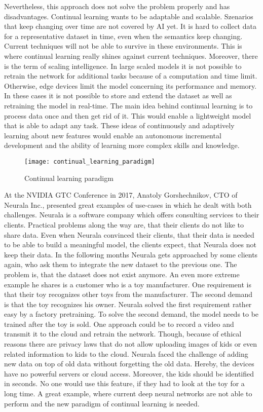 Nevertheless, this approach does not solve the problem properly and has disadvantages.
Continual learning wants to be adaptable and scalable.
Szenarios that keep changing over time are not covered by AI yet.
It is hard to collect data for a representative dataset in time, even when the semantics keep changing.
Current techniques will not be able to survive in these environments.
This is where continual learning really shines against current techniques.
Moreover, there is the term of scaling intelligence.
In large scaled models it is not possible to retrain the network for additional tasks because of a computation and time limit.
Otherwise, edge devices limit the model concerning its performance and memory.
In these cases it is not possible to store and extend the dataset as well as retraining the model in real-time.
The main idea behind continual learning is to process data once and then get rid of it.
This would enable a lightweight model that is able to adapt any task.
These ideas of continuously and adaptively learning about new features would enable an autonomous incremental development and the ability of learning more complex skills and knowledge.
\cite{continual-ai-blog}

\begin{figure}[H]
    \centering
    \texttt{[image: continual\_learning\_paradigm]}
    \caption{Continual learning paradigm}
\end{figure}

At the NVIDIA GTC Conference in 2017, Anatoly Gorshechnikov, CTO of Neurala Inc., presented great examples of use-cases in which he dealt with both challenges.
Neurala is a software company which offers consulting services to their clients.
Practical problems along the way are, that their clients do not like to share data.
Even when Neurala convinced their clients, that their data is needed to be able to build a meaningful model, the clients expect, that Neurala does not keep their data.
In the following months Neurala gets approached by some clients again, who ask them to integrate the new dataset to the previous one.
The problem is, that the dataset does not exist anymore.
\hfill \break
An even more extreme example he shares is a customer who is a toy manufacturer.
One requirement is that their toy recognizes other toys from the manufacturer.
The second demand is that the toy recognizes his owner.
Neurala solved the first requirement rather easy by a factory pretraining.
To solve the second demand, the model needs to be trained after the toy is sold.
One approach could be to record a video and transmit it to the cloud and retrain the network.
Though, because of ethical reasons there are privacy laws that do not allow uploading images of kids or even related information to kids to the cloud.
Neurala faced the challenge of adding new data on top of old data without forgetting the old data.
Hereby, the devices have no powerful servers or cloud access.
Moreover, the kids should be identified in seconds.
No one would use this feature, if they had to look at the toy for a long time.
\hfill \break
A great example, where current deep neural networks are not able to perform and the new paradigm of continual learning is needed.
\cite{neurala_video}

